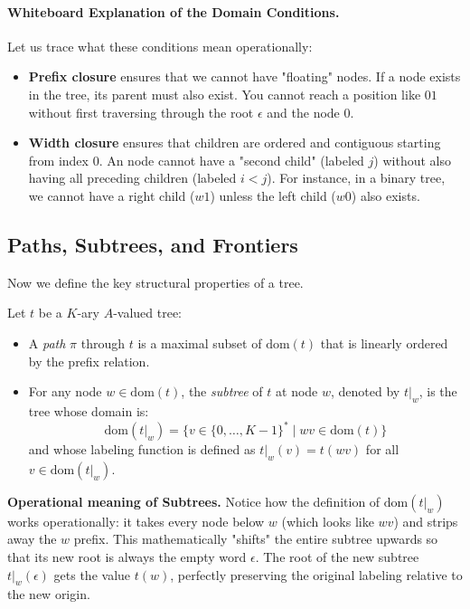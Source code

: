\paragraph{Whiteboard Explanation of the Domain Conditions.}
Let us trace what these conditions mean operationally:
\begin{itemize}
    \item \textbf{Prefix closure} ensures that we cannot have "floating" nodes. If a node exists in the tree, its parent must also exist. You cannot reach a position like $01$ without first traversing through the root $\epsilon$ and the node $0$.
    \item \textbf{Width closure} ensures that children are ordered and contiguous starting from index $0$. An node cannot have a "second child" (labeled $j$) without also having all preceding children (labeled $i < j$). For instance, in a binary tree, we cannot have a right child ($w1$) unless the left child ($w0$) also exists.
\end{itemize}

\subsection{Paths, Subtrees, and Frontiers}
Now we define the key structural properties of a tree.

\begin{definition}
Let $t$ be a $K$-ary $A$-valued tree:
\begin{itemize}
    \item A \emph{path} $\pi$ through $t$ is a maximal subset of $\text{dom}(t)$ that is linearly ordered by the prefix relation.
    \item For any node $w \in \text{dom}(t)$, the \emph{subtree} of $t$ at node $w$, denoted by $t|_w$, is the tree whose domain is:
    $$\text{dom}(t|_w) = \{ v \in \{0, \dots, K-1\}^* \mid w v \in \text{dom}(t) \}$$
    and whose labeling function is defined as $t|_w(v) = t(w v)$ for all $v \in \text{dom}(t|_w)$.
\end{itemize}
\end{definition}

\medskip\noindent
\textbf{Operational meaning of Subtrees.} Notice how the definition of $\text{dom}(t|_w)$ works operationally: it takes every node below $w$ (which looks like $wv$) and strips away the $w$ prefix. This mathematically "shifts" the entire subtree upwards so that its new root is always the empty word $\epsilon$. The root of the new subtree $t|_w(\epsilon)$ gets the value $t(w)$, perfectly preserving the original labeling relative to the new origin.

